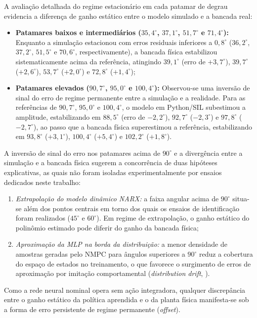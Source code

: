 A avaliação detalhada do regime estacionário em cada patamar de degrau evidencia a diferença de ganho estático entre o modelo simulado e a bancada real:
\begin{itemize}
    \item \textbf{Patamares baixos e intermediários ($35{,}4^\circ$, $37{,}1^\circ$, $51{,}7^\circ$ e $71{,}4^\circ$):} Enquanto a simulação estacionou com erros residuais inferiores a $0{,}8^\circ$ ($36{,}2^\circ$, $37{,}2^\circ$, $51{,}5^\circ$ e $70{,}6^\circ$, respectivamente), a bancada física estabilizou sistematicamente acima da referência, atingindo $39{,}1^\circ$ (erro de $+3{,}7^\circ$), $39{,}7^\circ$ ($+2{,}6^\circ$), $53{,}7^\circ$ ($+2{,}0^\circ$) e $72{,}8^\circ$ ($+1{,}4^\circ$);
    \item \textbf{Patamares elevados ($90{,}7^\circ$, $95{,}0^\circ$ e $100{,}4^\circ$):} Observou-se uma inversão de sinal do erro de regime permanente entre a simulação e a realidade. Para as referências de $90{,}7^\circ$, $95{,}0^\circ$ e $100{,}4^\circ$, o modelo em Python/SIL subestimou a amplitude, estabilizando em $88{,}5^\circ$ (erro de $-2{,}2^\circ$), $92{,}7^\circ$ ($-2{,}3^\circ$) e $97{,}8^\circ$ ($-2{,}7^\circ$), ao passo que a bancada física superestimou a referência, estabilizando em $93{,}8^\circ$ ($+3{,}1^\circ$), $100{,}4^\circ$ ($+5{,}4^\circ$) e $102{,}2^\circ$ ($+1{,}8^\circ$).
\end{itemize}
A inversão de sinal do erro nos patamares acima de $90^\circ$ e a divergência entre a simulação e a bancada física sugerem a concorrência de duas hipóteses explicativas, as quais não foram isoladas experimentalmente por ensaios dedicados neste trabalho:
\begin{enumerate}
    \item \textit{Extrapolação do modelo dinâmico NARX:} a faixa angular acima de $90^\circ$ situa-se além dos pontos centrais em torno dos quais os ensaios de identificação foram realizados ($45^\circ$ e $60^\circ$). Em regime de extrapolação, o ganho estático do polinômio estimado pode diferir do ganho da bancada física;
    \item \textit{Aproximação da MLP na borda da distribuição:} a menor densidade de amostras geradas pelo NMPC para ângulos superiores a $90^\circ$ reduz a cobertura do espaço de estados no treinamento, o que favorece o surgimento de erros de aproximação por imitação comportamental (\textit{distribution drift}, ).
\end{enumerate}
Como a rede neural nominal opera sem ação integradora, qualquer discrepância entre o ganho estático da política aprendida e o da planta física manifesta-se sob a forma de erro persistente de regime permanente (\textit{offset}).

